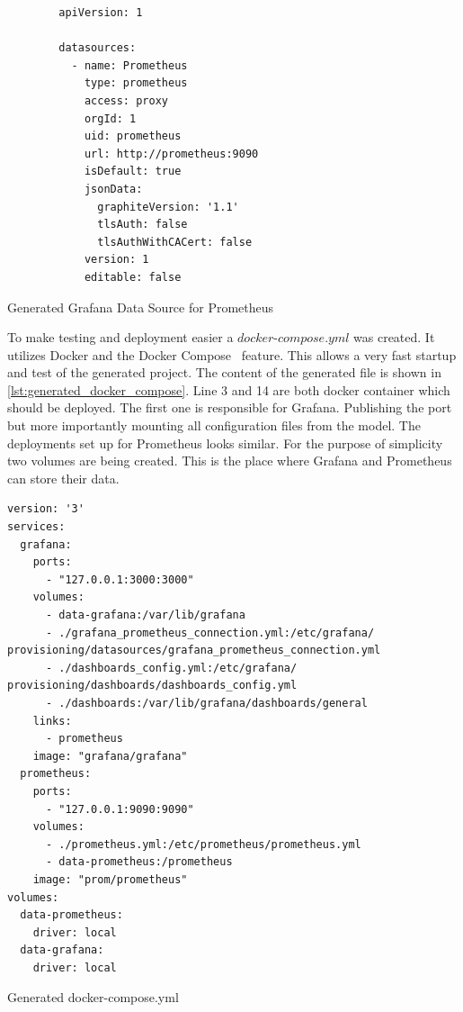 \begin{listing}[!ht]
	\begin{verbatim}
        apiVersion: 1
        
        datasources:
          - name: Prometheus
            type: prometheus
            access: proxy
            orgId: 1
            uid: prometheus
            url: http://prometheus:9090
            isDefault: true
            jsonData:
              graphiteVersion: '1.1'
              tlsAuth: false
              tlsAuthWithCACert: false
            version: 1
            editable: false
	\end{verbatim}
	\caption{Generated Grafana Data Source for Prometheus}
	\label{lst:generated_data_source}
\end{listing}

To make testing and deployment easier a $docker\text{-}compose.yml$ was created. It utilizes Docker and the Docker Compose~\cite{poulton2019docker} feature.  This allows a very fast startup and test of the generated project. The content of the generated file is shown in \cref{lst:generated_docker_compose}. Line 3 and 14 are both docker container which should be deployed. The first one is responsible for Grafana. Publishing the port but more importantly mounting all configuration files from the model. The deployments set up for Prometheus looks similar. For the purpose of simplicity two volumes are being created. This is the place where Grafana and Prometheus can store their data.

\begin{listing}[!ht]
	\begin{verbatim}
version: '3'
services:
  grafana:
    ports:
      - "127.0.0.1:3000:3000"
    volumes:
      - data-grafana:/var/lib/grafana
      - ./grafana_prometheus_connection.yml:/etc/grafana/ provisioning/datasources/grafana_prometheus_connection.yml
      - ./dashboards_config.yml:/etc/grafana/ provisioning/dashboards/dashboards_config.yml
      - ./dashboards:/var/lib/grafana/dashboards/general
    links:
      - prometheus
    image: "grafana/grafana"
  prometheus:
    ports:
      - "127.0.0.1:9090:9090"
    volumes:
      - ./prometheus.yml:/etc/prometheus/prometheus.yml
      - data-prometheus:/prometheus
    image: "prom/prometheus"
volumes:
  data-prometheus:
    driver: local
  data-grafana:
    driver: local
	\end{verbatim}
	\caption{Generated docker-compose.yml}
	\label{lst:generated_docker_compose}
\end{listing}

